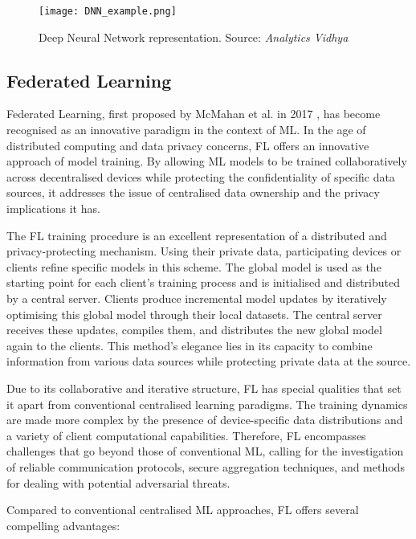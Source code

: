 \begin{figure}[h!]
        \centering %
        \texttt{[image: DNN\_example.png]}
        \caption{Deep Neural Network representation. Source: \textit{Analytics Vidhya}} %
        \label{fig:DNN_example}
\end{figure}


\subsection{Federated Learning}
Federated Learning, first proposed by McMahan et al. in 2017 \cite{FederatedLearningPaper}, has become recognised as an innovative paradigm in the context of ML. In the age of distributed computing and data privacy concerns, FL offers an innovative approach of model training. By allowing ML models to be trained collaboratively across decentralised devices while protecting the confidentiality of specific data sources, it addresses the issue of centralised data ownership and the privacy implications it has.

The FL training procedure is an excellent representation of a distributed and privacy-protecting mechanism. Using their private data, participating devices or clients refine specific models in this scheme. The global model is used as the starting point for each client's training process and is initialised and distributed by a central server. Clients produce incremental model updates by iteratively optimising this global model through their local datasets. The central server receives these updates, compiles them, and distributes the new global model again to the clients. This method's elegance lies in its capacity to combine information from various data sources while protecting private data at the source.

Due to its collaborative and iterative structure, FL has special qualities that set it apart from conventional centralised learning paradigms. The training dynamics are made more complex by the presence of device-specific data distributions and a variety of client computational capabilities. Therefore, FL encompasses challenges that go beyond those of conventional ML, calling for the investigation of reliable communication protocols, secure aggregation techniques, and methods for dealing with potential adversarial threats.

Compared to conventional centralised ML approaches, FL offers several compelling advantages:

